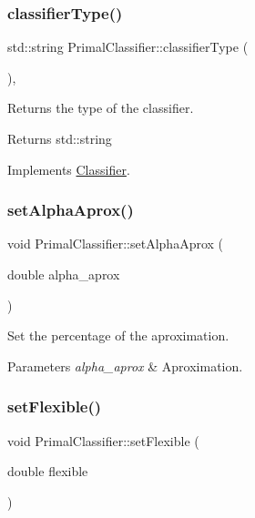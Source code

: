 \subsubsection{\texorpdfstring{classifier\+Type()}{classifierType()}}
{\footnotesize\ttfamily std\+::string Primal\+Classifier\+::classifier\+Type (\begin{DoxyParamCaption}{ }\end{DoxyParamCaption})\hspace{0.3cm}{\ttfamily [inline]}, {\ttfamily [virtual]}}



Returns the type of the classifier. 

\begin{DoxyReturn}{Returns}
std\+::string 
\end{DoxyReturn}


Implements \hyperlink{class_classifier_a7bfe7cc88b851b4a7e7ec55b30dd844e}{Classifier}.

\mbox{\label{class_primal_classifier_a49be3fca8d8383d98f9d671d1e1f27c7}} 
\subsubsection{\texorpdfstring{set\+Alpha\+Aprox()}{setAlphaAprox()}}
{\footnotesize\ttfamily void Primal\+Classifier\+::set\+Alpha\+Aprox (\begin{DoxyParamCaption}\item[{double}]{alpha\+\_\+aprox }\end{DoxyParamCaption})}



Set the percentage of the aproximation. 


\begin{DoxyParams}{Parameters}
{\em alpha\+\_\+aprox} & Aproximation. \\
\hline
\end{DoxyParams}
\mbox{\label{class_primal_classifier_acf3edea17de00a41c33d0fee4fabd4da}} 
\subsubsection{\texorpdfstring{set\+Flexible()}{setFlexible()}}
{\footnotesize\ttfamily void Primal\+Classifier\+::set\+Flexible (\begin{DoxyParamCaption}\item[{double}]{flexible }\end{DoxyParamCaption})}



